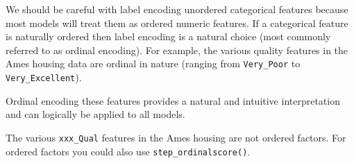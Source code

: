 \documentclass[]{krantz}
\makeatletter
\newenvironment{Shaded}{\begin{snugshade}}{\end{snugshade}}
\newcommand{\CommentTok}[1]{\textcolor[rgb]{0.37,0.37,0.37}{\textit{#1}}}
\newcommand{\KeywordTok}[1]{\textcolor[rgb]{0.27,0.27,0.27}{\textbf{#1}}}
\newcommand{\NormalTok}[1]{#1}
\newcommand{\OperatorTok}[1]{\textcolor[rgb]{0.43,0.43,0.43}{\textbf{#1}}}
\newcommand{\StringTok}[1]{\textcolor[rgb]{0.5,0.5,0.5}{#1}}
\newenvironment{kframe}{%
\medskip{}
\setlength{\fboxsep}{.8em}
 \def\at@end@of@kframe{}%
 \ifinner\ifhmode%
  \def\at@end@of@kframe{\end{minipage}}%
  \begin{minipage}{\columnwidth}%
 \fi\fi%
 \def\FrameCommand##1{\hskip\@totalleftmargin \hskip-\fboxsep
 \colorbox{shadecolor}{##1}\hskip-\fboxsep
     \hskip-\linewidth \hskip-\@totalleftmargin \hskip\columnwidth}%
 \MakeFramed {\advance\hsize-\width
   \@totalleftmargin\z@ \linewidth\hsize
   \@setminipage}}%
 {\par\unskip\endMakeFramed%
 \at@end@of@kframe}
\newenvironment{block}[1]
  {
  \begin{itemize}
  \renewcommand{\labelitemi}{
    \raisebox{-.7\height}[0pt][0pt]{
      {\setkeys{Gin}{width=3em,keepaspectratio}\texttt{[image: icons/\#1]}}
    }
  }
  \setlength{\fboxsep}{1em}
  \begin{kframe}
  \item
  }
  {
  \end{kframe}
  \end{itemize}
  }
\newenvironment{tip}
  {\begin{block}{tip}}
  {\end{block}}
\renewenvironment{Shaded}{\begin{kframe}}{\end{kframe}}
\makeatother
\begin{document}
We should be careful with label encoding unordered categorical features because most models will treat them as ordered numeric features. If a categorical feature is naturally ordered then label encoding is a natural choice (most commonly referred to as ordinal encoding). For example, the various quality features in the Ames housing data are ordinal in nature (ranging from \texttt{Very\_Poor} to \texttt{Very\_Excellent}).

\begin{Shaded}
\end{Shaded}

Ordinal encoding these features provides a natural and intuitive interpretation and can logically be applied to all models.

\begin{tip}
The various \texttt{xxx\_Qual} features in the Ames housing are not
ordered factors. For ordered factors you could also use
\texttt{step\_ordinalscore()}.
\end{tip}
\end{document}
